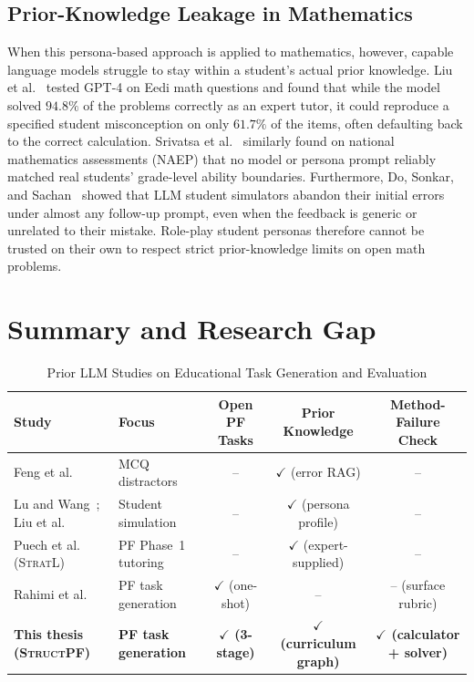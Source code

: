 \subsection{Prior-Knowledge Leakage in Mathematics}
\label{subsec:bg-eval-simstudents}
When this persona-based approach is applied to mathematics, however, capable language models struggle to stay within a student's actual prior knowledge. Liu et al.~\cite{liu2023novice} tested GPT-4 on Eedi math questions and found that while the model solved $94.8\%$ of the problems correctly as an expert tutor, it could reproduce a specified student misconception on only $61.7\%$ of the items, often defaulting back to the correct calculation. Srivatsa et al.~\cite{srivatsa2025abilities} similarly found on national mathematics assessments (NAEP) that no model or persona prompt reliably matched real students' grade-level ability boundaries. Furthermore, Do, Sonkar, and Sachan~\cite{do2026faithfulness} showed that LLM student simulators abandon their initial errors under almost any follow-up prompt, even when the feedback is generic or unrelated to their mistake. Role-play student personas therefore cannot be trusted on their own to respect strict prior-knowledge limits on open math problems.

\section{Summary and Research Gap}
\label{sec:bg-gap}

\begin{table}[!htb]
\centering
\caption[Prior LLM Studies on Educational Task Generation and Evaluation]{Prior LLM Studies on Educational Task Generation and Evaluation}
\label{tab:bg-llm-comparison}
\footnotesize
\setlength{\tabcolsep}{3.5pt}
\renewcommand{\arraystretch}{1.35}
\begin{tabular}{@{} l l c c c @{}}
\toprule
\textbf{Study} & \textbf{Focus} & \textbf{Open PF Tasks} & \textbf{Prior Knowledge} & \textbf{Method-Failure Check} \\
\midrule
Feng et al.~\cite{feng2024} & MCQ distractors & -- & $\checkmark$ (error RAG) & -- \\
\addlinespace[3pt]
Lu and Wang~\cite{lu2024}; Liu et al.~\cite{liu2023novice} & Student simulation & -- & $\checkmark$ (persona profile) & -- \\
\addlinespace[3pt]
Puech et al.~\cite{puech2025} (\textsc{StratL}) & PF Phase~1 tutoring & -- & $\checkmark$ (expert-supplied) & -- \\
\addlinespace[3pt]
Rahimi et al.~\cite{rahimi2025productivemath,rahimi2025} & PF task generation & $\checkmark$ (one-shot) & -- & -- (surface rubric) \\
\midrule
\textbf{This thesis (\textsc{StructPF})} & \textbf{PF task generation} & \textbf{$\checkmark$ (3-stage)} & \textbf{$\checkmark$ (curriculum graph)} & \textbf{$\checkmark$ (calculator + solver)} \\
\bottomrule
\end{tabular}
\end{table}

